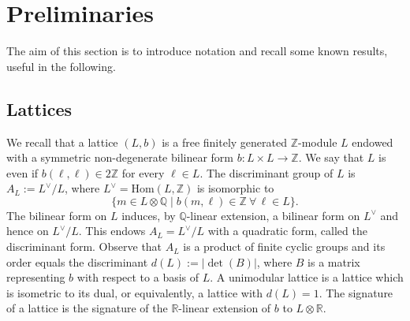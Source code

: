 \documentclass{amsart}
\theoremstyle{definition}
\numberwithin{equation}{section}
\numberwithin{equation}{section} \theoremstyle{definition}
\begin{document}
\section{Preliminaries}\label{preliminaries}\label{sec: preliminaries}
The aim of this section is to introduce notation and recall some known results, useful in the following.
\subsection{Lattices}
We recall that a lattice $(L,b)$ is a free finitely generated $\mathbb{Z}$-module $L$
endowed with a symmetric non-degenerate bilinear form $b\colon L\times L\to \mathbb{Z}$.
We say that $L$ is even if $b(\ell,\ell)\in 2\mathbb{Z}$ for every $\ell\in L$. The
discriminant group of $L$ is $A_L:=L^{\vee}/L$, where
$L^{\vee}=\mathrm{Hom}(L,\mathbb{Z})$ is isomorphic to
$$\{m\in L\otimes \mathbb{Q}\mid b(m,\ell)\in \mathbb{Z}\ \forall\,\ell\in L\}.$$
The bilinear form on $L$ induces, by $\mathbb{Q}$-linear extension, a bilinear form on
$L^{\vee}$ and hence on $L^{\vee}/L$. This endows $A_L=L^{\vee}/L$ with a quadratic
form, called the discriminant form. Observe that $A_L$ is a product of finite cyclic
groups and its order equals the discriminant $d(L):=|\det(B)|$, where $B$ is a matrix
representing $b$ with respect to a basis of $L$. A unimodular lattice is a lattice
which is isometric to its dual, or equivalently, a lattice with $d(L)=1$. The
signature of a lattice is the signature of the $\mathbb{R}$-linear extension of $b$
to $L\otimes \mathbb{R}$.
\end{document}
